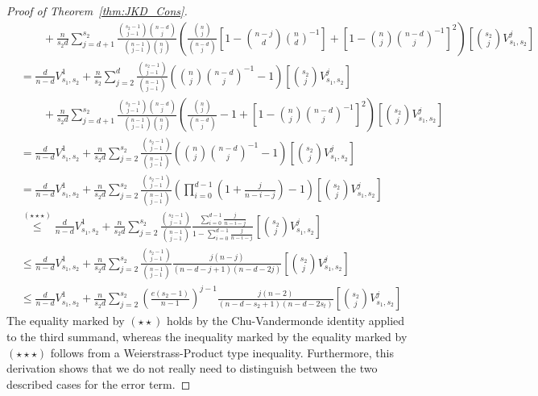 \begin{proof}[Proof of Theorem~\ref{thm:JKD_Cons}]
\begin{equation}
\begin{aligned}
			 & \quad \quad + \frac{n}{s_2 d}\sum_{j = d + 1}^{s_2}\frac{\binom{s_2 - 1}{j - 1}\binom{n - d}{j}}{\binom{n - 1}{j - 1}\binom{n}{j}}
			\left(\frac{\binom{n}{j}}{\binom{n - d}{j}}\left[1 - \binom{n - j}{d}\binom{n}{d}^{-1}\right]
			+ \left[1 - \binom{n}{j}\binom{n-d}{j}^{-1}\right]^{2}\right)\left[\binom{s_2}{j}V_{s_1, s_2}^{j}\right]                                                     \\
			 & = \frac{d}{n - d} V_{s_1, s_2}^{1} + \frac{n}{s_2}\sum_{j = 2}^{d}\frac{\binom{s_2 - 1}{j - 1}}{\binom{n - 1}{j - 1}}
			\left(\binom{n}{j}\binom{n-d}{j}^{-1} - 1\right)\left[\binom{s_2}{j}V_{s_1, s_2}^{j}\right]                                                                  \\
			 & \quad \quad + \frac{n}{s_2 d}\sum_{j = d + 1}^{s_2}\frac{\binom{s_2 - 1}{j - 1}\binom{n - d}{j}}{\binom{n - 1}{j - 1}\binom{n}{j}}
			\left(\frac{\binom{n}{j}}{\binom{n - d}{j}} - 1
			+ \left[1 - \binom{n}{j}\binom{n-d}{j}^{-1}\right]^{2}\right)\left[\binom{s_2}{j}V_{s_1, s_2}^{j}\right]                                                     \\
			 & = \frac{d}{n - d} V_{s_1, s_2}^{1} + \frac{n}{s_2 d}\sum_{j = 2}^{s_2}\frac{\binom{s_2 - 1}{j - 1}}{\binom{n - 1}{j - 1}}
			\left(\binom{n}{j}\binom{n-d}{j}^{-1} - 1\right)\left[\binom{s_2}{j}V_{s_1, s_2}^{j}\right]                                                                  \\
			 & = \frac{d}{n - d} V_{s_1, s_2}^{1} + \frac{n}{s_2 d}\sum_{j = 2}^{s_2}\frac{\binom{s_2 - 1}{j - 1}}{\binom{n - 1}{j - 1}}
			\left(\prod_{i = 0}^{d - 1}\left(1 + \frac{j}{n - i - j}\right) - 1\right)\left[\binom{s_2}{j}V_{s_1, s_2}^{j}\right]                                        \\
			 & \overset{(\star\star\star)}{\leq} \frac{d}{n - d} V_{s_1, s_2}^{1} + \frac{n}{s_2 d}\sum_{j = 2}^{s_2}\frac{\binom{s_2 - 1}{j - 1}}{\binom{n - 1}{j - 1}}
			\frac{\sum_{i = 0}^{d - 1}\frac{j}{n - i - j}}{1 - \sum_{i = 0}^{d - 1}\frac{j}{n - i - j}}\left[\binom{s_2}{j}V_{s_1, s_2}^{j}\right]                       \\
			 & \leq \frac{d}{n - d} V_{s_1, s_2}^{1} + \frac{n}{s_2 d}\sum_{j = 2}^{s_2}\frac{\binom{s_2 - 1}{j - 1}}{\binom{n - 1}{j - 1}}
			\frac{j (n - j)}{(n - d - j + 1)(n - d - 2 j)}\left[\binom{s_2}{j}V_{s_1, s_2}^{j}\right]                                                                    \\
			 & \leq \frac{d}{n - d} V_{s_1, s_2}^{1} + \frac{n}{s_2 d}\sum_{j = 2}^{s_2}\left(\frac{e (s_2 - 1)}{n - 1}\right)^{j-1}
			\frac{j (n - 2)}{(n - d - s_2 + 1)(n - d - 2s_t)}\left[\binom{s_2}{j}V_{s_1, s_2}^{j}\right]
		\end{aligned}
	\end{equation}
	The equality marked by $(\star\star)$ holds by the Chu-Vandermonde identity applied to the third summand, whereas the inequality marked by the equality marked by $(\star\star\star)$ follows from a Weierstrass-Product type inequality.
	Furthermore, this derivation shows that we do not really need to distinguish between the two described cases for the error term.


\end{proof}
